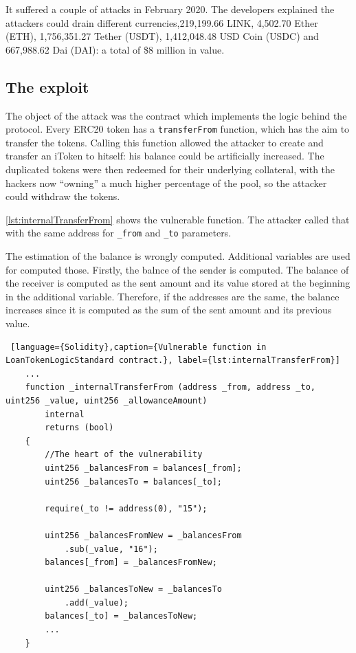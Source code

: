 It suffered a couple of attacks in February 2020.
The developers explained the attackers could drain different currencies,219,199.66 LINK, 4,502.70 Ether (ETH), 1,756,351.27 Tether (USDT), 
1,412,048.48 USD Coin (USDC) and 667,988.62 Dai (DAI): a total of \$8 million in value. 

\subsection{The exploit}

The object of the attack was the contract which implements the logic behind the protocol.
Every ERC20 token has a \texttt{transferFrom} function, which has the aim to transfer the tokens.
Calling this function allowed the attacker to create and transfer an iToken to hitself: his balance could be artificially increased.
The duplicated tokens were then redeemed for their underlying collateral, 
with the hackers now “owning” a much higher percentage of the pool, so the attacker could withdraw the tokens.

\autoref{lst:internalTransferFrom} shows the vulnerable function. 
The attacker called that with the same address for \texttt{\_from} and \texttt{\_to} parameters. 

The estimation of the balance is wrongly computed. Additional variables are used for computed those. 
Firstly, the balnce of the sender is computed. 
The balance of the receiver is computed as the sent amount and its value stored at the beginning in the additional variable. 
Therefore, if the addresses are the same, the balance increases since it is computed as the sum of the sent amount and its previous value.

\begin{lstlisting} [language={Solidity},caption={Vulnerable function in LoanTokenLogicStandard contract.}, label={lst:internalTransferFrom}]
    ... 
    function _internalTransferFrom (address _from, address _to, uint256 _value, uint256 _allowanceAmount)
        internal
        returns (bool)
    {
        //The heart of the vulnerability 
        uint256 _balancesFrom = balances[_from];
        uint256 _balancesTo = balances[_to];

        require(_to != address(0), "15");

        uint256 _balancesFromNew = _balancesFrom
            .sub(_value, "16");
        balances[_from] = _balancesFromNew;

        uint256 _balancesToNew = _balancesTo
            .add(_value);
        balances[_to] = _balancesToNew;
        ...
    }
\end{lstlisting}

